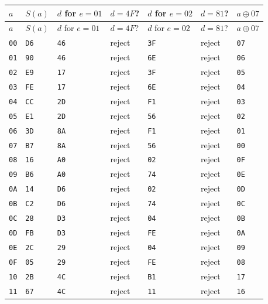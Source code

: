 \begingroup\small
\begin{longtable}{lllllll}
\toprule
$a$ & $S(a)$ & $d$ for $e=01$ & $d=4F$? & $d$ for $e=02$ & $d=81$? & $a\oplus07$\\
\midrule
\endfirsthead
\toprule
$a$ & $S(a)$ & $d$ for $e=01$ & $d=4F$? & $d$ for $e=02$ & $d=81$? & $a\oplus07$\\
\midrule
\endhead
\texttt{00} & \texttt{D6} & \texttt{46} & reject & \texttt{3F} & reject & \texttt{07}\\
\texttt{01} & \texttt{90} & \texttt{46} & reject & \texttt{6E} & reject & \texttt{06}\\
\texttt{02} & \texttt{E9} & \texttt{17} & reject & \texttt{3F} & reject & \texttt{05}\\
\texttt{03} & \texttt{FE} & \texttt{17} & reject & \texttt{6E} & reject & \texttt{04}\\
\texttt{04} & \texttt{CC} & \texttt{2D} & reject & \texttt{F1} & reject & \texttt{03}\\
\texttt{05} & \texttt{E1} & \texttt{2D} & reject & \texttt{56} & reject & \texttt{02}\\
\texttt{06} & \texttt{3D} & \texttt{8A} & reject & \texttt{F1} & reject & \texttt{01}\\
\texttt{07} & \texttt{B7} & \texttt{8A} & reject & \texttt{56} & reject & \texttt{00}\\
\texttt{08} & \texttt{16} & \texttt{A0} & reject & \texttt{02} & reject & \texttt{0F}\\
\texttt{09} & \texttt{B6} & \texttt{A0} & reject & \texttt{74} & reject & \texttt{0E}\\
\texttt{0A} & \texttt{14} & \texttt{D6} & reject & \texttt{02} & reject & \texttt{0D}\\
\texttt{0B} & \texttt{C2} & \texttt{D6} & reject & \texttt{74} & reject & \texttt{0C}\\
\texttt{0C} & \texttt{28} & \texttt{D3} & reject & \texttt{04} & reject & \texttt{0B}\\
\texttt{0D} & \texttt{FB} & \texttt{D3} & reject & \texttt{FE} & reject & \texttt{0A}\\
\texttt{0E} & \texttt{2C} & \texttt{29} & reject & \texttt{04} & reject & \texttt{09}\\
\texttt{0F} & \texttt{05} & \texttt{29} & reject & \texttt{FE} & reject & \texttt{08}\\
\texttt{10} & \texttt{2B} & \texttt{4C} & reject & \texttt{B1} & reject & \texttt{17}\\
\texttt{11} & \texttt{67} & \texttt{4C} & reject & \texttt{11} & reject & \texttt{16}\\

\end{longtable}
